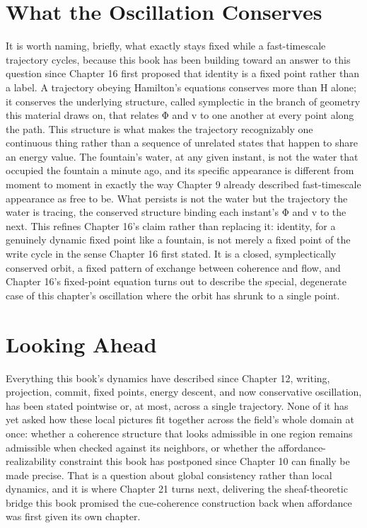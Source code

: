 \section{What the Oscillation Conserves}

It is worth naming, briefly, what exactly stays fixed while a fast-timescale trajectory cycles, because this book has been building toward an answer to this question since Chapter 16 first proposed that identity is a fixed point rather than a label. A trajectory obeying Hamilton's equations conserves more than H alone; it conserves the underlying structure, called symplectic in the branch of geometry this material draws on, that relates Φ and v to one another at every point along the path. This structure is what makes the trajectory recognizably one continuous thing rather than a sequence of unrelated states that happen to share an energy value. The fountain's water, at any given instant, is not the water that occupied the fountain a minute ago, and its specific appearance is different from moment to moment in exactly the way Chapter 9 already described fast-timescale appearance as free to be. What persists is not the water but the trajectory the water is tracing, the conserved structure binding each instant's Φ and v to the next. This refines Chapter 16's claim rather than replacing it: identity, for a genuinely dynamic fixed point like a fountain, is not merely a fixed point of the write cycle in the sense Chapter 16 first stated. It is a closed, symplectically conserved orbit, a fixed pattern of exchange between coherence and flow, and Chapter 16's fixed-point equation turns out to describe the special, degenerate case of this chapter's oscillation where the orbit has shrunk to a single point.

\section{Looking Ahead}

Everything this book's dynamics have described since Chapter 12, writing, projection, commit, fixed points, energy descent, and now conservative oscillation, has been stated pointwise or, at most, across a single trajectory. None of it has yet asked how these local pictures fit together across the field's whole domain at once: whether a coherence structure that looks admissible in one region remains admissible when checked against its neighbors, or whether the affordance-realizability constraint this book has postponed since Chapter 10 can finally be made precise. That is a question about global consistency rather than local dynamics, and it is where Chapter 21 turns next, delivering the sheaf-theoretic bridge this book promised the cue-coherence construction back when affordance was first given its own chapter.
